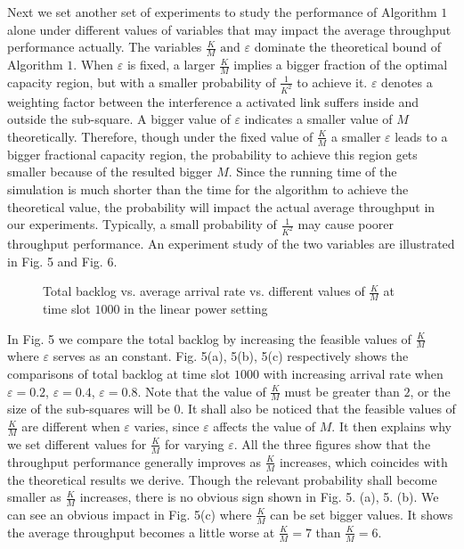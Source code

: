 \documentclass[journal]{IEEEtran}
\begin{document}
Next we set another set of experiments to study the performance of Algorithm $1$ alone under different values of variables that may impact the average throughput performance actually. The variables $\frac{K}{M} \mbox{~and~} \varepsilon$ dominate the theoretical bound of Algorithm $1$. When $\varepsilon$ is fixed, a larger $\frac{K}{M}$ implies a bigger fraction of the optimal capacity region, but with a smaller probability of $\frac{1}{K^2}$ to achieve it.  $\varepsilon$ denotes a weighting factor between the interference a activated link suffers inside and outside the sub-square. A bigger value of $\varepsilon$ indicates a smaller value of $M$ theoretically. Therefore, though under the fixed value of $\frac{K}{M}$ a smaller  $\varepsilon$ leads to a bigger fractional capacity region, the probability to achieve this region gets smaller because of the resulted bigger $M$. Since the running time of the simulation is much shorter than the time for the algorithm to achieve the theoretical value, the probability will impact the actual average throughput in our experiments. Typically, a small probability of $\frac{1}{K^2}$ may cause poorer throughput performance. An  experiment study of the two variables are illustrated in Fig. 5 and Fig. 6.

\begin{figure*}[htpb]
    \centering
    \hspace{0cm}
    \hspace{0cm}
    \captionsetup{justification=centering}
     \caption{{\small{Total backlog vs. average arrival rate  vs. different values of $\frac{K}{M}$  at time slot $1000$ in the linear power setting}}}
\vspace*{-1\baselineskip}
\end{figure*}

In Fig. 5 we compare the total backlog by increasing the feasible values of $\frac{K}{M}$ where $\varepsilon$ serves as an constant. Fig. 5(a), 5(b), 5(c) respectively shows the comparisons of total backlog at time slot $1000$ with increasing arrival rate when $\varepsilon=0.2$, $\varepsilon=0.4$, $\varepsilon=0.8$. Note that the value of $\frac{K}{M}$ must be greater than $2$, or the size of the sub-squares will be $0$. It shall also be noticed that the feasible values of $\frac{K}{M}$ are different when $\varepsilon$ varies, since $\varepsilon$ affects the value of $M$. It then explains why we set different values for $\frac{K}{M}$ for varying $\varepsilon$.
All the three figures show that the throughput performance generally improves as $\frac{K}{M}$ increases, which coincides with the theoretical results we derive. Though the relevant probability shall become smaller as $\frac{K}{M}$ increases, there is no obvious sign shown in Fig. 5. (a), 5. (b). We can see an obvious impact in Fig. 5(c) where $\frac{K}{M}$ can be set bigger values. It shows the average throughput becomes a little worse at $\frac{K}{M}=7$ than $\frac{K}{M}=6$.
\end{document}
